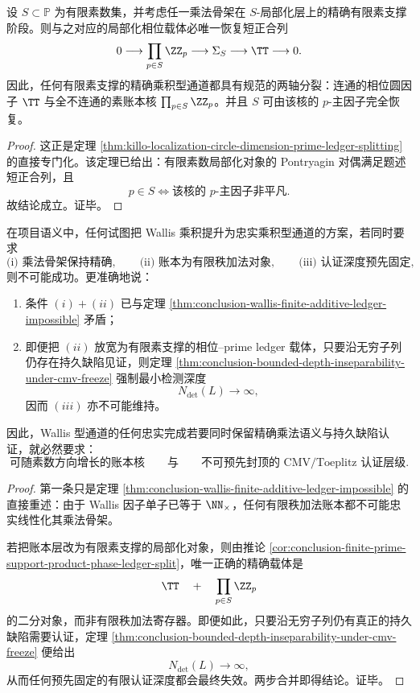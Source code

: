 \begin{corollary}\label{cor:conclusion-finite-prime-support-product-phase-ledger-split}
设 \(S\subset \mathbb P\) 为有限素数集，并考虑任一乘法骨架在 \(S\)-局部化层上的精确有限素支撑阶段。则与之对应的局部化相位载体必唯一恢复短正合列
\[
0\longrightarrow \prod_{p\in S}\ZZ_p
\longrightarrow \Sigma_S
\longrightarrow \TT
\longrightarrow 0.
\]
因此，任何有限素支撑的精确乘积型通道都具有规范的两轴分裂：连通的相位圆因子 \(\TT\) 与全不连通的素账本核 \(\prod_{p\in S}\ZZ_p\)。并且 \(S\) 可由该核的 \(p\)-主因子完全恢复。
\end{corollary}
\begin{proof}
这正是定理 \ref{thm:killo-localization-circle-dimension-prime-ledger-splitting} 的直接专门化。该定理已给出：有限素数局部化对象的 Pontryagin 对偶满足题述短正合列，且
\[
p\in S
\iff
\text{该核的 \(p\)-主因子非平凡}.
\]
故结论成立。证毕。
\end{proof}

\begin{theorem}\label{thm:conclusion-wallis-product-completion-threshold}
在项目语义中，任何试图把 Wallis 乘积提升为忠实乘积型通道的方案，若同时要求
\[
\text{(i) 乘法骨架保持精确},\qquad
\text{(ii) 账本为有限秩加法对象},\qquad
\text{(iii) 认证深度预先固定},
\]
则不可能成功。更准确地说：
\begin{enumerate}
  \item 条件 \((i)+(ii)\) 已与定理 \ref{thm:conclusion-wallis-finite-additive-ledger-impossible} 矛盾；
  \item 即便把 \((ii)\) 放宽为有限素支撑的相位--prime ledger 载体，只要沿无穷子列仍存在持久缺陷见证，则定理 \ref{thm:conclusion-bounded-depth-inseparability-under-cmv-freeze} 强制最小检测深度
  \[
  N_{\det}(L)\to\infty,
  \]
  因而 \((iii)\) 亦不可能维持。
\end{enumerate}
因此，Wallis 型通道的任何忠实完成若要同时保留精确乘法语义与持久缺陷认证，就必然要求：
\[
\text{可随素数方向增长的账本核}
\qquad\text{与}\qquad
\text{不可预先封顶的 CMV/Toeplitz 认证层级}.
\]
\end{theorem}
\begin{proof}
第一条只是定理 \ref{thm:conclusion-wallis-finite-additive-ledger-impossible} 的直接重述：由于 Wallis 因子单子已等于 \(\NN_{\times}\)，任何有限秩加法账本都不可能忠实线性化其乘法骨架。

若把账本层改为有限素支撑的局部化对象，则由推论 \ref{cor:conclusion-finite-prime-support-product-phase-ledger-split}，唯一正确的精确载体是
\[
\TT \quad+\quad \prod_{p\in S}\ZZ_p
\]
的二分对象，而非有限秩加法寄存器。即便如此，只要沿无穷子列仍有真正的持久缺陷需要认证，定理 \ref{thm:conclusion-bounded-depth-inseparability-under-cmv-freeze} 便给出
\[
N_{\det}(L)\to\infty,
\]
从而任何预先固定的有限认证深度都会最终失效。两步合并即得结论。证毕。
\end{proof}

